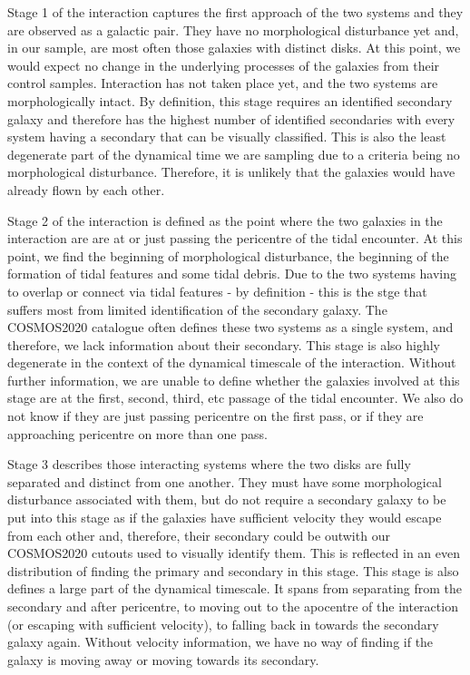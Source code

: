 \documentclass[fleqn,usenatbib]{mnras}
\begin{document}
Stage 1 of the interaction captures the first approach of the two systems and they are observed as a galactic pair. They have no morphological disturbance yet and, in our sample, are most often those galaxies with distinct disks. At this point, we would expect no change in the underlying processes of the galaxies from their control samples. Interaction has not taken place yet, and the two systems are morphologically intact. By definition, this stage requires an identified secondary galaxy and therefore has the highest number of identified secondaries with every system having a secondary that can be visually classified. This is also the least degenerate part of the dynamical time we are sampling due to a criteria being no morphological disturbance. Therefore, it is unlikely that the galaxies would have already flown by each other.

Stage 2 of the interaction is defined as the point where the two galaxies in the interaction are are at or just passing the pericentre of the tidal encounter. At this point, we find the beginning of morphological disturbance, the beginning of the formation of tidal features and some tidal debris. Due to the two systems having to overlap or connect via tidal features - by definition - this is the stge that suffers most from limited identification of the secondary galaxy. The COSMOS2020 catalogue often defines these two systems as a single system, and therefore, we lack information about their secondary. This stage is also highly degenerate in the context of the dynamical timescale of the interaction. Without further information, we are unable to define whether the galaxies involved at this stage are at the first, second, third, etc passage of the tidal encounter. We also do not know if they are just passing pericentre on the first pass, or if they are approaching pericentre on more than one pass.

Stage 3 describes those interacting systems where the two disks are fully separated and distinct from one another. They must have some morphological disturbance associated with them, but do not require a secondary galaxy to be put into this stage as if the galaxies have sufficient velocity they would escape from each other and, therefore, their secondary could be outwith our COSMOS2020 cutouts used to visually identify them. This is reflected in an even distribution of finding the primary and secondary in this stage. This stage is also defines a large part of the dynamical timescale. It spans from separating from the secondary and after pericentre, to moving out to the apocentre of the interaction (or escaping with sufficient velocity), to falling back in towards the secondary galaxy again. Without velocity information, we have no way of finding if the galaxy is moving away or moving towards its secondary.
\end{document}
